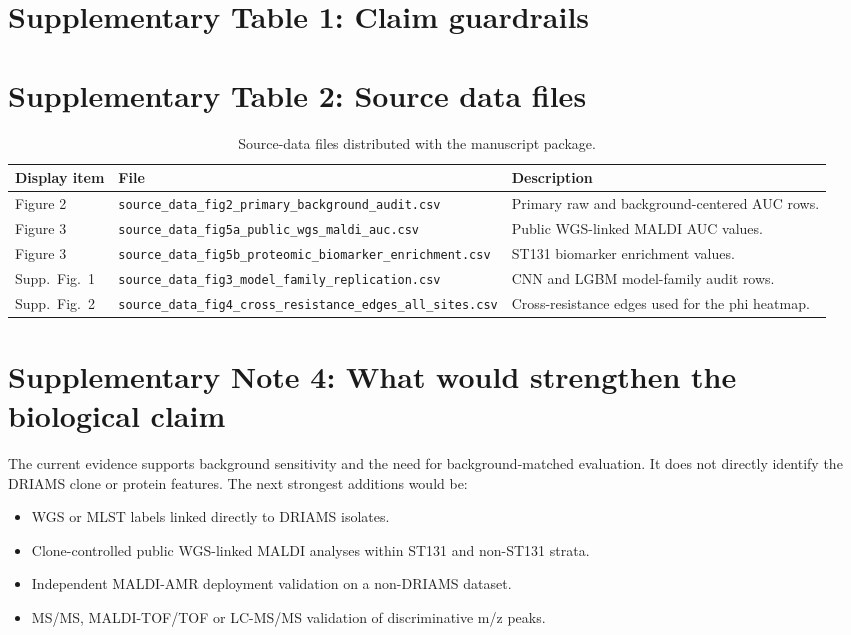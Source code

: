 \documentclass[11pt]{article}
\begin{document}
\section*{Supplementary Table 1: Claim guardrails}



\section*{Supplementary Table 2: Source data files}

\begin{table}[ht]
\centering
\small
\caption{Source-data files distributed with the manuscript package.}
\begin{tabular}{lll}
\toprule
Display item & File & Description \\
\midrule
Figure 2 & \texttt{source\_data\_fig2\_primary\_background\_audit.csv} & Primary raw and background-centered AUC rows. \\
Figure 3 & \texttt{source\_data\_fig5a\_public\_wgs\_maldi\_auc.csv} & Public WGS-linked MALDI AUC values. \\
Figure 3 & \texttt{source\_data\_fig5b\_proteomic\_biomarker\_enrichment.csv} & ST131 biomarker enrichment values. \\
Supp.\ Fig.\ 1 & \texttt{source\_data\_fig3\_model\_family\_replication.csv} & CNN and LGBM model-family audit rows. \\
Supp.\ Fig.\ 2 & \texttt{source\_data\_fig4\_cross\_resistance\_edges\_all\_sites.csv} & Cross-resistance edges used for the phi heatmap. \\
\bottomrule
\end{tabular}
\end{table}

\section*{Supplementary Note 4: What would strengthen the biological claim}

The current evidence supports background sensitivity and the need for background-matched evaluation. It does not directly identify the DRIAMS clone or protein features. The next strongest additions would be:

\begin{itemize}
  \item WGS or MLST labels linked directly to DRIAMS isolates.
  \item Clone-controlled public WGS-linked MALDI analyses within ST131 and non-ST131 strata.
  \item Independent MALDI-AMR deployment validation on a non-DRIAMS dataset.
  \item MS/MS, MALDI-TOF/TOF or LC-MS/MS validation of discriminative m/z peaks.
\end{itemize}
\end{document}
